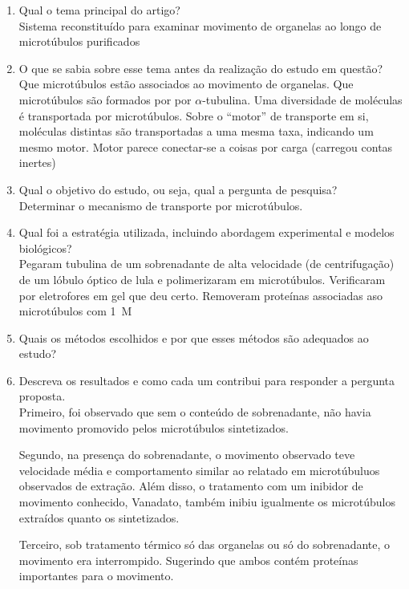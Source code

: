 \begin{enumerate}
    \item Qual o tema principal do artigo?\\
        Sistema reconstituído para examinar movimento de organelas ao longo de microtúbulos purificados
        
    \item O que se sabia sobre esse tema antes da realização do estudo em questão? \\
        Que microtúbulos estão associados ao movimento de organelas. Que microtúbulos são formados por por \(\alpha\)-tubulina. Uma diversidade de moléculas é transportada por microtúbulos. Sobre o ``motor'' de transporte em si, moléculas distintas são transportadas a uma mesma taxa, indicando um mesmo motor. Motor parece conectar-se a coisas por carga (carregou contas inertes)

    \item Qual o objetivo do estudo, ou seja, qual a pergunta de pesquisa? \\
        Determinar o mecanismo de transporte por microtúbulos.
    \item Qual foi a estratégia utilizada, incluindo abordagem experimental e modelos  biológicos? \\
        Pegaram tubulina de um sobrenadante de alta velocidade (de centrifugação) de um lóbulo óptico de lula e polimerizaram em microtúbulos. Verificaram por eletrofores em gel que deu certo. Removeram proteínas associadas aso microtúbulos com \qty{1}{M} 
    \item Quais os métodos escolhidos e por que esses métodos são adequados ao estudo? 
    \item Descreva os resultados e como cada um contribui para responder a pergunta proposta.\\
        Primeiro, foi observado que sem o conteúdo de sobrenadante, não havia movimento promovido pelos microtúbulos sintetizados. 

        Segundo, na presença do sobrenadante, o movimento observado teve velocidade média e comportamento similar ao relatado em microtúbuluos observados de extração. Além disso, o tratamento com um inibidor de movimento conhecido, Vanadato, também inibiu igualmente os microtúbulos extraídos quanto os sintetizados.

        Terceiro, sob tratamento térmico só das organelas ou só do sobrenadante, o movimento era interrompido. Sugerindo que ambos contém proteínas importantes para o movimento.


\end{enumerate}
